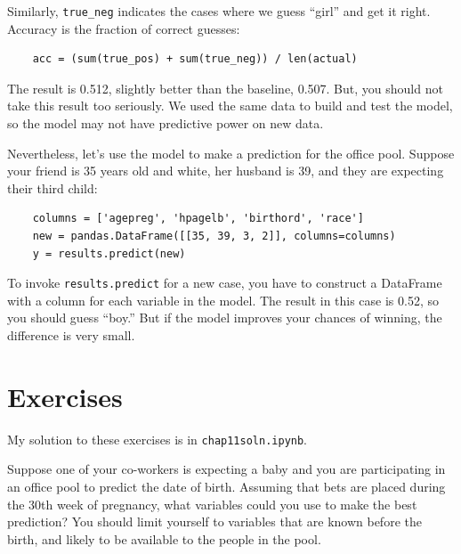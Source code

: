 \documentclass[12pt]{book}
\begin{document}
Similarly, \verb"true_neg" indicates the cases where we guess ``girl''
and get it right.  Accuracy is the fraction of correct guesses:

\begin{verbatim}
    acc = (sum(true_pos) + sum(true_neg)) / len(actual)
\end{verbatim}

The result is 0.512, slightly better than the
baseline, 0.507.  But, you should not take this result too seriously.
We used the same data to build and test the model, so the model
may not have predictive power on new data.

Nevertheless, let's use the model to make a prediction for the office
pool.  Suppose your friend is 35 years old and white,
her husband is 39, and they are expecting their third child:

\begin{verbatim}
    columns = ['agepreg', 'hpagelb', 'birthord', 'race']
    new = pandas.DataFrame([[35, 39, 3, 2]], columns=columns)
    y = results.predict(new)
\end{verbatim}

To invoke {\tt results.predict} for a new case, you have to construct
a DataFrame with a column for each variable in the model.  The result
in this case is 0.52, so you should guess ``boy.''  But if the model
improves your chances of winning, the difference is very small.



\section{Exercises}

My solution to these exercises is in \verb"chap11soln.ipynb".

\begin{exercise}
Suppose one of your co-workers is expecting a baby and you are
participating in an office pool to predict the date of birth.
Assuming that bets are placed during the 30th week of pregnancy, what
variables could you use to make the best prediction?  You should limit
yourself to variables that are known before the birth, and likely to
be available to the people in the pool.

\end{exercise}
\end{document}
